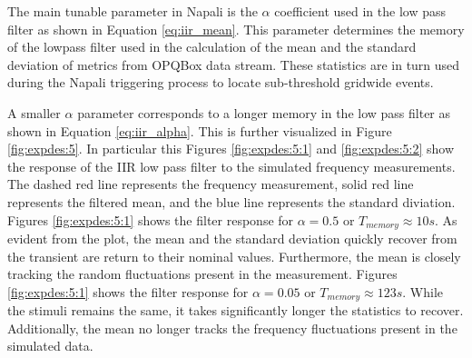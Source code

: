The main tunable parameter in Napali is the $\alpha$ coefficient used in the low pass filter as shown in Equation \ref{eq:iir_mean}.
This parameter determines the memory of the lowpass filter used in the calculation of the mean and the standard deviation of metrics from OPQBox data stream.
These statistics are in turn used during the Napali triggering process to locate sub-threshold gridwide events.

A smaller $\alpha$ parameter corresponds to a longer memory in the low pass filter as shown in Equation \ref{eq:iir_alpha}.
This is further visualized in Figure \ref{fig:expdes:5}.
In particular this Figures \ref{fig:expdes:5:1} and \ref{fig:expdes:5:2} show the response of the IIR low pass filter to the simulated frequency measurements.
The dashed red line represents the frequency measurement, solid red line represents the filtered mean, and the blue line represents the standard diviation.
Figures \ref{fig:expdes:5:1} shows the filter response for $\alpha = 0.5$ or $T_{memory} \approx 10s $.
As evident from the plot, the mean and the standard deviation quickly recover from the transient are return to their nominal values.
Furthermore, the mean is closely tracking the random fluctuations present in the measurement.
Figures \ref{fig:expdes:5:1} shows the filter response for $\alpha = 0.05$ or $T_{memory} \approx 123s $.
While the stimuli remains the same, it takes significantly longer the statistics to recover.
Additionally, the mean no longer tracks the frequency fluctuations present in the simulated data.
